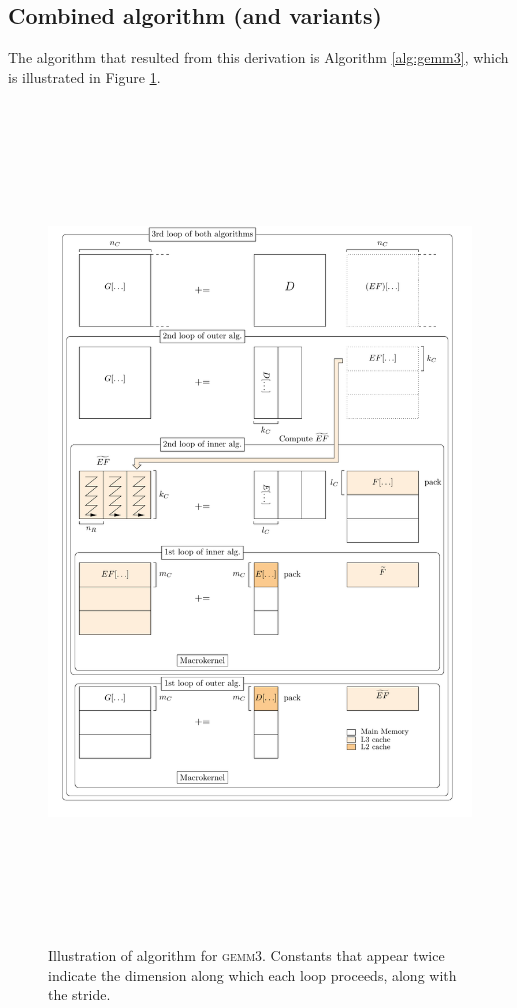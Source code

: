 \documentclass[12pt]{article}
\newcommand*{\gemmt}{{\textsc{gemm3}}}
\begin{document}
\subsection{Combined algorithm (and variants)}
The algorithm that resulted from this derivation is Algorithm \ref{alg:gemm3}, which is illustrated in Figure \ref{fig:gemm3}.

\begin{figure}
  \centering
  \includegraphics[height=8.75in]{gemm3-picture}
  \caption{Illustration of algorithm for \gemmt{}. Constants that appear twice indicate the dimension along which each loop proceeds, along with the stride.}
  \label{fig:gemm3}
\end{figure}
\end{document}
